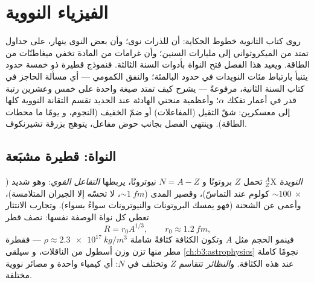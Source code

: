 \chapter{الفيزياء النووية}\label{ch:b3:nuclear-physics}


روى كتاب الثانوية خطوط الحكاية: أن للذرات نوى؛ وأن
بعض النوى ينهار، على جداول تمتد من الميكروثواني إلى
مليارات السنين؛ وأن غرامات من المادة تخفي ميغاطنّات من الطاقة. ويعيد
هذا الفصل فتح النواة بأدوات السنة الثالثة. فنموذج قطيرة ذو
خمسة حدود يتنبأ بارتباط مئات النويدات في حدود
البالمئة؛ والنفق الكمومي --- أي مسألة الحاجز في كتاب السنة الثانية،
مرفوعةً --- يشرح كيف تمتد صيغة واحدة على خمس وعشرين رتبة
قدر في أعمار تفكك $\alpha$؛ وأعظمية منحني 
الهادئة عند الحديد تقسم التقانة النووية كلها إلى
معسكرين: شقّ الثقيل (المفاعلات) أو ضمّ الخفيف (النجوم، و
يومًا ما محطات الطاقة). وينتهي الفصل بجانب حوض مفاعل،
يتوهج بزرقة تشيرنكوف.

\section{النواة: قطيرة مشبَعة}

\begin{definition}\label{def:b3:nuclear-physics:nuclide}
\emph{النويدة} $^{A}_{Z}\text{X}$ تحمل $Z$ بروتونًا و $N = A -
Z$ نيوترونًا، يربطها \emph{التفاعل القوي}: وهو شديد
(${\sim}\qty{100}{}\times$ كولوم عند التماسّ)، وقصير المدى
(${\sim}\qty{1}{fm}$، لا تحسّه إلا الجيران المتلامسة)، وأعمى
عن الشحنة (فهو يمسك البروتونات والنيوترونات سواءً بسواء). وتجارب
الانتثار تعطي كل نواة الوصفة نفسها: نصف قطر
\[
R = r_0A^{1/3} , \qquad r_0 \approx \qty{1.2}{fm} ,
\]
فينمو الحجم مثل $A$ وتكون الكثافة كثافةً شاملة
$\rho \approx \qty{2.3e17}{kg/m^3}$ --- فقطرة مطر منها
تزن وزن أسطول من الناقلات، و
سيلقى \cref{ch:b3:astrophysics} نجومًا كاملة عند هذه الكثافة.
و\emph{النظائر} تتقاسم $Z$ وتختلف في $N$: أي كيمياء واحدة و
مصائر نووية مختلفة.
\end{definition}

